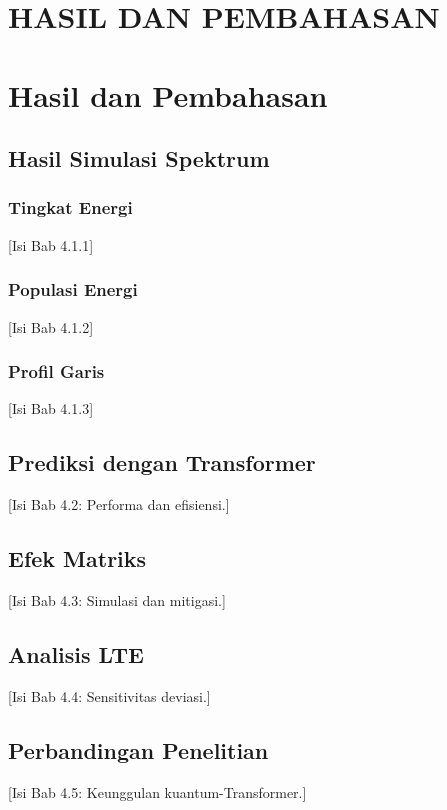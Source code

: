 \chapter{HASIL DAN PEMBAHASAN}

\chapter{Hasil dan Pembahasan}
\section{Hasil Simulasi Spektrum}
\subsection{Tingkat Energi}
[Isi Bab 4.1.1]

\subsection{Populasi Energi}
[Isi Bab 4.1.2]

\subsection{Profil Garis}
[Isi Bab 4.1.3]

\section{Prediksi dengan Transformer}
[Isi Bab 4.2: Performa dan efisiensi.]

\section{Efek Matriks}
[Isi Bab 4.3: Simulasi dan mitigasi.]

\section{Analisis LTE}
[Isi Bab 4.4: Sensitivitas deviasi.]

\section{Perbandingan Penelitian}
[Isi Bab 4.5: Keunggulan kuantum-Transformer.]

